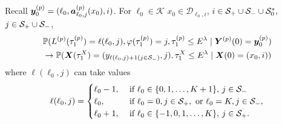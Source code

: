 \begin{cor}\label{cor: aln222} Recall \(\boldsymbol y_{0}^{(p)} = (\ell_0, \boldsymbol a_{\ell_0,j}^{(p)}(x_0), i)\). For \(\ell_0\in\mathcal K\) \(x_0\in\mathcal D_{\ell_0,i}\), \(i\in\mathcal S_+\cup\mathcal{S}_-\cup\mathcal{S}_{0}^{*},\) \(j\in\mathcal{S}_+\cup\mathcal{S}_-\), 
	\begin{align}
		&\mathbb P(L^{(p)}(\tau_1^{(p)}) = \ell(\ell_0,j), \varphi(\tau_1^{(p)}) = j, \tau_{1}^{(p)}\leq E^\lambda 
            	 \mid \boldsymbol Y^{(p)}(0) = \boldsymbol y_0^{(p)}) \nonumber
		\\&\to \mathbb P(\boldsymbol X(\tau_1^X) = (y_{\ell(\ell_0,j)+1(j\in\mathcal{S}_-)}, j), \tau_{1}^X\leq E^\lambda 
            	 \mid \boldsymbol X(0) = (x_0,i))\label{eqn: 1421}
	\end{align}
	where \(\ell(\ell_0,j)\) can take values
	\begin{align*}
		\ell(\ell_0,j) = \begin{cases}
			\ell_0-1, &\mbox{ if } \ell_0\in\{0,1,\dots,K+1\},\, j\in\mathcal{S}_-\\
			\ell_0, & \mbox{ if } \ell_0 = 0, j\in\mathcal S_+, \mbox{ or }\ell_0 = K, j\in\mathcal S_-,\\
			\ell_0+1, & \mbox{ if } \ell_0\in\{-1,0,1,\dots,K\},\, j\in\mathcal{S}_+.
		\end{cases}
	\end{align*}
\end{cor}

